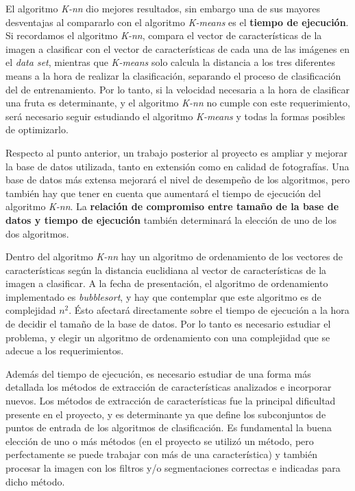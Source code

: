 \documentclass[10pt,a4paper]{article}
\begin{document}
El algoritmo \textit{K-nn} dio mejores resultados, sin embargo una de sus mayores desventajas al compararlo con el algoritmo \textit{K-means} es el \textbf{tiempo de ejecución}. Si recordamos el algoritmo \textit{K-nn}, compara el vector de características de la imagen a clasificar con el vector de características de cada una de las imágenes en el \textit{data set}, mientras que \textit{K-means} solo calcula la distancia a los tres diferentes means a la hora de realizar la clasificación, separando el proceso de clasificación del de entrenamiento. Por lo tanto, si la velocidad necesaria a la hora de clasificar una fruta es determinante, y el algoritmo \textit{K-nn} no cumple con este requerimiento, será necesario seguir estudiando el algoritmo \textit{K-means} y todas la formas posibles de optimizarlo.

Respecto al punto anterior, un trabajo posterior al proyecto es ampliar y mejorar la base de datos utilizada, tanto en extensión como en calidad de fotografías. Una base de datos más extensa mejorará el nivel de desempeño de los algoritmos, pero también hay que tener en cuenta que aumentará el tiempo de ejecución del algoritmo \textit{K-nn}. La \textbf{relación de compromiso entre tamaño de la base de datos y tiempo de ejecución} también determinará la elección de uno de los dos algoritmos.

Dentro del algoritmo \textit{K-nn} hay un algoritmo de ordenamiento de los vectores de características según la distancia euclidiana al vector de características de la imagen a clasificar. A la fecha de presentación, el algoritmo de ordenamiento implementado es \textit{bubblesort}, y hay que contemplar que este algoritmo es de complejidad $n^{2}$. Ésto afectará directamente sobre el tiempo de ejecución a la hora de decidir el tamaño de la base de datos. Por lo tanto es necesario estudiar el problema, y elegir un algoritmo de ordenamiento con una complejidad que se adecue a los requerimientos.

Además del tiempo de ejecución, es necesario estudiar de una forma más detallada los métodos de extracción de características analizados e incorporar nuevos. Los métodos de extracción de características fue la principal dificultad presente en el proyecto, y es determinante ya que define los subconjuntos de puntos de entrada de los algoritmos de clasificación. Es fundamental la buena elección de uno o más métodos (en el proyecto se utilizó un método, pero perfectamente se puede trabajar con más de una característica) y también procesar la imagen con los filtros y/o segmentaciones correctas e indicadas para dicho método.

\printbibliography

\newpage
\tableofcontents
\end{document}
